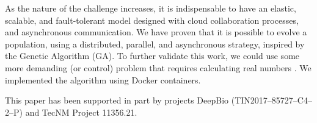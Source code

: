 \documentclass[graybox]{svmult}
\begin{document}
    As the nature of the challenge increases, it is indispensable to have an
    elastic, scalable, and fault-tolerant model designed with cloud
    collaboration processes, and asynchronous communication. We have proven
    that it is possible to evolve a population, using a distributed, parallel,
    and asynchronous strategy, inspired by the Genetic Algorithm (GA). To
    further validate this work, we could use some more demanding (or control)
    problem that requires calculating real numbers
    \cite{stanley2002evolving,miikkulainen2019evolving}. We implemented the
    algorithm using Docker containers.


\begin{acknowledgement}
    This paper has been supported in part by projects DeepBio (TIN2017--85727--C4--2--P) and TecNM Project 11356.21\@.
\end{acknowledgement}

%


%

\end{document}
